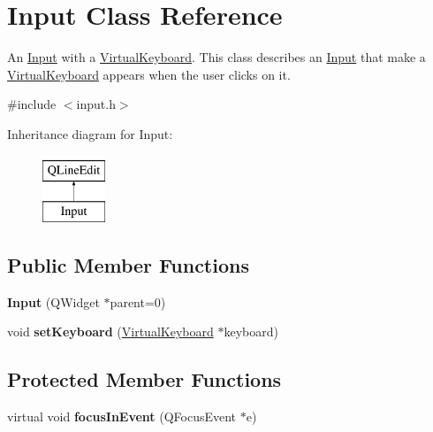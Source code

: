 \hypertarget{classInput}{}\section{Input Class Reference}
\label{classInput}


An \hyperlink{classInput}{Input} with a \hyperlink{classVirtualKeyboard}{Virtual\+Keyboard}. This class describes an \hyperlink{classInput}{Input} that make a \hyperlink{classVirtualKeyboard}{Virtual\+Keyboard} appears when the user clicks on it.  




{\ttfamily \#include $<$input.\+h$>$}

Inheritance diagram for Input\+:\begin{figure}[H]
\begin{center}
\leavevmode
\includegraphics[height=2.000000cm]{classInput}
\end{center}
\end{figure}
\subsection*{Public Member Functions}
\begin{DoxyCompactItemize}
\item 
\hypertarget{classInput_aa0d8e1f203a9f4f7d09d921eaf9de9e9}{}{\bfseries Input} (Q\+Widget $\ast$parent=0)\label{classInput_aa0d8e1f203a9f4f7d09d921eaf9de9e9}

\item 
\hypertarget{classInput_a563600fc96a7dc9fb6f10084b8d2a987}{}void {\bfseries set\+Keyboard} (\hyperlink{classVirtualKeyboard}{Virtual\+Keyboard} $\ast$keyboard)\label{classInput_a563600fc96a7dc9fb6f10084b8d2a987}

\end{DoxyCompactItemize}
\subsection*{Protected Member Functions}
\begin{DoxyCompactItemize}
\item 
\hypertarget{classInput_a96c87d224c535cdc881909378966cb9c}{}virtual void {\bfseries focus\+In\+Event} (Q\+Focus\+Event $\ast$e)\label{classInput_a96c87d224c535cdc881909378966cb9c}

\end{DoxyCompactItemize}


